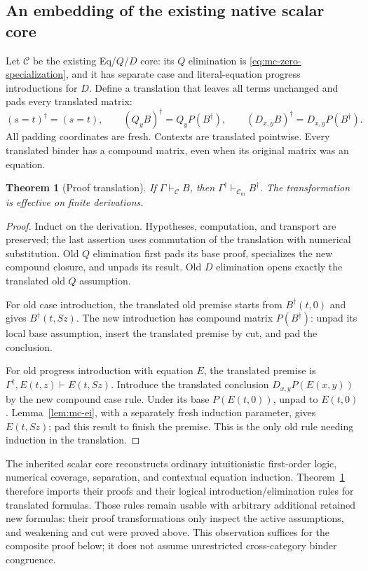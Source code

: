 \documentclass[11pt,letterpaper]{article}
\newtheorem{theorem}{Theorem}[section]
\theoremstyle{definition}
\theoremstyle{remark}
\begin{document}
\subsection{An embedding of the existing native scalar core}

Let $\mathcal C$ be the existing Eq/$Q$/$D$ core: its $Q$ elimination
is \eqref{eq:mc-zero-specialization}, and it has separate case and
literal-equation progress introductions for $D$.  Define a translation
that leaves all terms unchanged and pads every translated matrix:
\[
 (s=t)^\dagger=(s=t),\qquad
 (Q_yB)^\dagger=Q_yP(B^\dagger),\qquad
 (D_{x,y}B)^\dagger=D_{x,y}P(B^\dagger).
 \tag{MC9}\label{eq:mc-embed}
\]
All padding coordinates are fresh.  Contexts are translated pointwise.
Every translated binder has a compound matrix, even when its original
matrix was an equation.

\begin{theorem}[Proof translation]
\label{thm:mc-embed}
If $\Gamma\vdash_{\mathcal C}B$, then
$\Gamma^\dagger\vdash_{\mathcal C_{\mathrm m}}B^\dagger$.
The transformation is effective on finite derivations.
\end{theorem}
\begin{proof}
Induct on the derivation.  Hypotheses, computation, and transport are
preserved; the last assertion uses commutation of the translation
with numerical substitution.  Old $Q$ elimination first pads its
base proof, specializes the new compound closure, and unpads its
result.  Old $D$ elimination opens exactly the translated old $Q$
assumption.

For old case introduction, the translated old premise starts from
$B^\dagger(t,0)$ and gives $B^\dagger(t,Sz)$.  The new introduction
has compound matrix $P(B^\dagger)$: unpad its local base assumption,
insert the translated premise by cut, and pad the conclusion.

For old progress introduction with equation $E$, the translated
premise is $\Gamma^\dagger,E(t,z)\vdash E(t,Sz)$.  Introduce the
translated conclusion $D_{x,y}P(E(x,y))$ by the new compound case
rule.  Under its base $P(E(t,0))$, unpad to $E(t,0)$.
Lemma~\ref{lem:mc-ei}, with a separately fresh induction parameter,
gives $E(t,Sz)$; pad this result to finish the premise.  This is the
only old rule needing induction in the translation.
\end{proof}

The inherited scalar core reconstructs ordinary intuitionistic
first-order logic, numerical coverage, separation, and contextual
equation induction.  Theorem~\ref{thm:mc-embed} therefore imports
their proofs and their logical introduction/elimination rules for
translated formulas.  Those rules remain usable with arbitrary
additional retained new formulas: their proof transformations only
inspect the active assumptions, and weakening and cut were proved
above.  This observation suffices for the composite proof below;
it does not assume unrestricted cross-category binder congruence.
\end{document}
